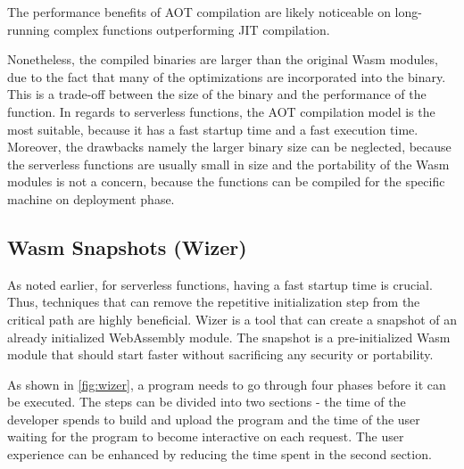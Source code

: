 The performance benefits of AOT compilation are likely noticeable on long-running complex functions outperforming JIT compilation.

Nonetheless, the compiled binaries are larger than the original Wasm modules, due to the fact that many of the optimizations are incorporated into the binary. This is a trade-off between the size of the binary and the performance of the function. 
In regards to serverless functions, the AOT compilation model is the most suitable, because it has a fast startup time and a fast execution time. Moreover, the drawbacks namely the larger binary size can be neglected, because the serverless functions are usually small in size and the portability of the Wasm modules is not a concern, because the functions can be compiled for the specific machine on deployment phase.

\subsection{Wasm Snapshots (Wizer)}
\label{sec:wizer}

As noted earlier, for \gls{serverless} functions, having a fast startup time is crucial. 
Thus, techniques that can remove the repetitive initialization step from the critical 
path are highly beneficial. Wizer is a tool that can create a snapshot of an already 
initialized WebAssembly module. The snapshot is a pre-initialized Wasm module that should start 
faster without sacrificing any security or portability. 

As shown in \autoref{fig:wizer}, a program needs to go through four phases before it can be executed. 
The steps can be divided into two sections - the time of the developer spends to build and upload the program and the time of the user waiting for the program to become interactive on each request. The user experience can be enhanced by reducing the time spent in the second section. 

